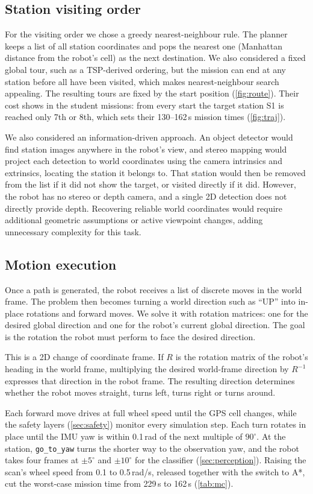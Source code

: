 \subsection{Station visiting order}
For the visiting order we chose a greedy nearest-neighbour rule. The planner keeps a list of all station coordinates and pops the nearest one (Manhattan distance from the robot's cell) as the next destination. We also considered a fixed global tour, such as a TSP-derived ordering, but the mission can end at any station before all have been visited, which makes nearest-neighbour search appealing. The resulting tours are fixed by the start position (\cref{fig:route}). Their cost shows in the student missions: from every start the target station S1 is reached only 7th or 8th, which sets their 130--162\,s mission times (\cref{fig:traj}).

We also considered an information-driven approach. An object detector would find station images anywhere in the robot's view, and stereo mapping would project each detection to world coordinates using the camera intrinsics and extrinsics, locating the station it belongs to. That station would then be removed from the list if it did not show the target, or visited directly if it did. However, the robot has no stereo or depth camera, and a single 2D detection does not directly provide depth. Recovering reliable world coordinates would require additional geometric assumptions or active viewpoint changes, adding unnecessary complexity for this task.

\subsection{Motion execution}
Once a path is generated, the robot receives a list of discrete moves in the world frame. The problem then becomes turning a world direction such as ``UP'' into in-place rotations and forward moves. We solve it with rotation matrices: one for the desired global direction and one for the robot's current global direction. The goal is the rotation the robot must perform to face the desired direction.

This is a 2D change of coordinate frame. If $R$ is the rotation matrix of the robot's heading in the world frame, multiplying the desired world-frame direction by $R^{-1}$ expresses that direction in the robot frame. The resulting direction determines whether the robot moves straight, turns left, turns right or turns around.

Each forward move drives at full wheel speed until the GPS cell changes, while the safety layers (\cref{sec:safety}) monitor every simulation step. Each turn rotates in place until the IMU yaw is within 0.1\,rad of the next multiple of $90^\circ$. At the station, \texttt{go\_to\_yaw} turns the shorter way to the observation yaw, and the robot takes four frames at $\pm5^\circ$ and $\pm10^\circ$ for the classifier (\cref{sec:perception}). Raising the scan's wheel speed from 0.1 to 0.5\,rad/s, released together with the switch to A*, cut the worst-case mission time from 229\,s to 162\,s (\cref{tab:mc}).

